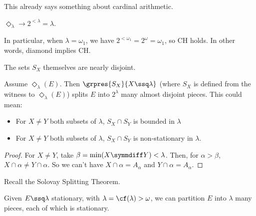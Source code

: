 This already says something about cardinal arithmetic.

\begin{boxcorollary}
    $\Diamond_{\lambda} \to 2^{<\lambda} = \lambda$.
\end{boxcorollary}

In particular, when $\lambda = \omega_1$, we have $2^{< \omega_1} = 2^{\omega} = \omega_1$, so CH holds. In other words, diamond implies CH.

The sets $S_X$ themselves are nearly disjoint.

\begin{boxlemma}
    Assume $\Diamond_{\lambda}(E)$. Then $\grpres{S_X}{X \ssq \lambda}$ (where $S_X$ is defined from the witness to $\Diamond_{\lambda}(E)$) splits $E$ into $2^{\lambda}$ many almost disjoint pieces. This could mean:
    \begin{itemize}
        \item For $X \neq Y$ both subsets of $\lambda$, $S_X \cap S_Y$ is bounded in $\lambda$
        \item For $X \neq Y$ both subsets of $\lambda$, $S_X \cap S_Y$ is non-stationary in $\lambda$.
    \end{itemize}
\end{boxlemma}
\begin{proof}
    For $X \neq Y$, take $\beta = \min(X \symmdiff Y) < \lambda$. Then, for $\alpha > \beta$, $X \cap \alpha \neq Y \cap \alpha$. So we can't have $X \cap \alpha = A_{\alpha}$ and $Y \cap \alpha  = A_{\alpha}$.
\end{proof}

Recall the Solovay Splitting Theorem.

\begin{boxtheorem}
    Given $E \ssq \lambda$ stationary, with $\lambda = \cf(\lambda) > \omega$, we can partition $E$ into $\lambda$ many pieces, each of which is stationary.
\end{boxtheorem}
